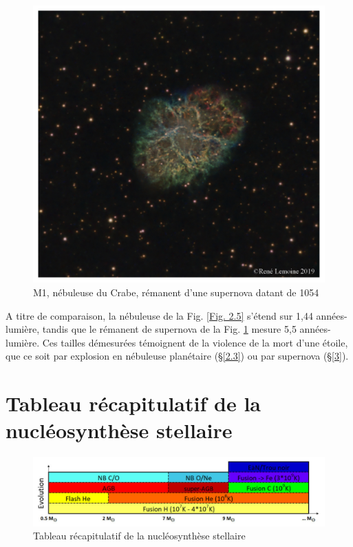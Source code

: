 \begin{figure}[H]
	\centering
	\includegraphics[scale=0.3]{images/m1}
	\caption[M1, nébuleuse du Crabe - astrophoto prise par René Lemoine le 29 janvier 2019 avec un Celestron 8 (6h de pose)]{M1, nébuleuse du Crabe, rémanent d'une supernova datant de 1054}
	\label{Fig. 2.7}
\end{figure}

A titre de comparaison, la nébuleuse de la Fig. \ref{Fig. 2.5} s'étend sur 1,44 années-lumière, tandis que le rémanent de supernova de la Fig. \ref{Fig. 2.7} mesure 5,5 années-lumière. Ces tailles démesurées témoignent de la violence de la mort d'une étoile, que ce soit par explosion en nébuleuse planétaire (§\ref{2.3}) ou par supernova (§\ref{3}). 

\section{Tableau récapitulatif de la nucléosynthèse stellaire}\label{2.5}

\begin{figure}[H]
	\centering
	\includegraphics[scale=0.55]{images/evo_stel_tab}
	\caption[Tableau récapitulatif de la nucléosynthèse stellaire - composé avec Excel 2016 ]{Tableau récapitulatif de la nucléosynthèse stellaire}
	\label{Fig. 2.8}
\end{figure}


